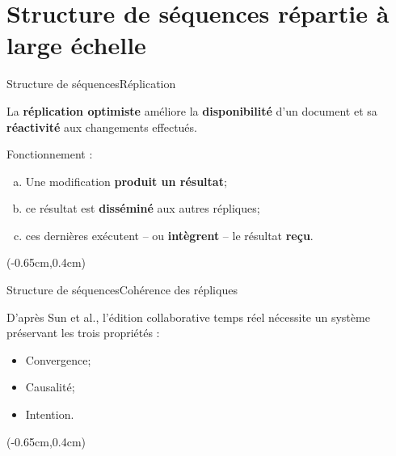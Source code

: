\section{Structure de séquences répartie à large échelle}

\begin{frame}{Structure de séquences}{Réplication}
  \vspace{-1.5cm}

  La \textbf{réplication optimiste} améliore
  la \textbf{disponibilité} d'un document et sa \textbf{réactivité} aux
  changements effectués.  \vspace{0.75cm}

  Fonctionnement :
  \begin{enumerate}[(a)]
  \item Une modification \textbf{produit un résultat};
  \item ce résultat est \textbf{disséminé} aux autres répliques;
  \item ces dernières exécutent -- ou \textbf{intègrent} -- le résultat
    \textbf{reçu}.
  \end{enumerate}

  \begin{textblock*}{\textwidth}(-0.65cm,0.4cm) 
    
  \end{textblock*}
  
  \vspace{1cm}

\end{frame}


\begin{frame}{Structure de séquences}{Cohérence des répliques}
  
  \vspace{-1.5cm}

  D'après Sun et al., l'édition collaborative
  temps réel nécessite un système préservant les trois propriétés :

  \begin{itemize}
  \item Convergence;
  \item Causalité;
  \item Intention.  
  \end{itemize}

  \begin{textblock*}{\textwidth}(-0.65cm,0.4cm) 
    
  \end{textblock*}

\end{frame}


